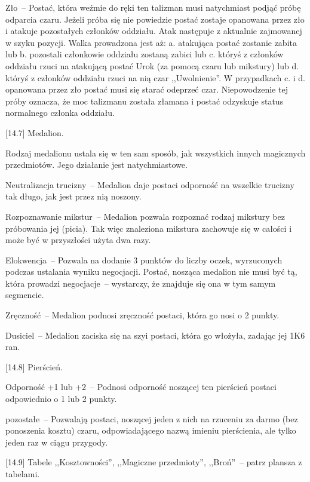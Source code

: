 Zło~-- Postać, która weźmie do ręki ten talizman musi natychmiast podjąć próbę odparcia czaru.
Jeżeli próba się nie powiedzie postać zostaje opanowana przez zło i atakuje pozostałych członków oddziału.
Atak następuje z aktualnie zajmowanej w szyku pozycji.
Walka prowadzona jest aż:
a. atakująca postać zostanie zabita lub
b. pozostali członkowie oddziału zostaną zabici lub
c. któryś z członków oddziału rzuci na atakującą postać Urok (za pomocą czaru lub mikstury) lub
d. któryś z członków oddziału rzuci na nią czar ,,Uwolnienie''.
W przypadkach c. i d. opanowana przez zło postać musi się starać odeprzeć czar.
Niepowodzenie tej próby oznacza, że moc talizmanu została złamana i postać odzyskuje status normalnego członka oddziału.

[14.7] Medalion.

Rodzaj medalionu ustala się w ten sam sposób, jak wszystkich innych magicznych przedmiotów.
Jego działanie jest natychmiastowe.

Neutralizacja trucizny~-- Medalion daje postaci odporność na wszelkie trucizny tak długo, jak jest przez nią noszony.

Rozpoznawanie mikstur~-- Medalion pozwala rozpoznać rodzaj mikstury bez próbowania jej (picia).
Tak więc znaleziona mikstura zachowuje się w całości i może być w przyszłości użyta dwa razy.

Elokwencja~-- Pozwala na dodanie 3 punktów do liczby oczek, wyrzuconych podczas ustalania wyniku negocjacji.
Postać, nosząca medalion nie musi być tą, która prowadzi negocjacje~-- wystarczy, że znajduje się ona w tym samym segmencie.

Zręczność~-- Medalion podnosi zręczność postaci, która go nosi o 2 punkty.

Dusiciel~-- Medalion zaciska się na szyi postaci, która go włożyła, zadając jej 1K6 ran.

[14.8] Pierścień.

Odporność +1 lub +2~-- Podnosi odporność noszącej ten pierścień postaci odpowiednio o 1 lub 2 punkty.

pozostałe~-- Pozwalają postaci, noszącej jeden z nich na rzuceniu za darmo (bez ponoszenia kosztu) czaru, odpowiadającego nazwą imieniu pierścienia, ale tylko jeden raz w ciągu przygody.

[14.9] Tabele ,,Kosztowności'', ,,Magiczne przedmioty'', ,,Broń''~-- patrz plansza z tabelami.

